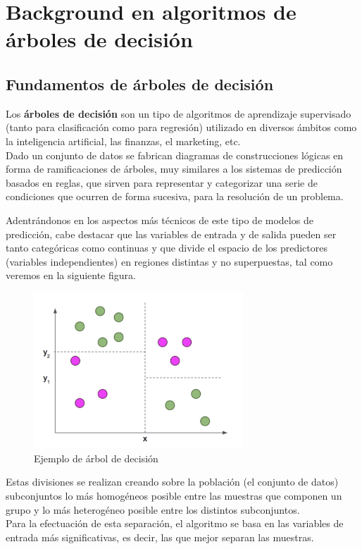 \chapter[Capítulo 3. Background en algoritmos de árboles de decisión]{Background en algoritmos de árboles de decisión}

\section{Fundamentos de árboles de decisión}

 Los \textbf{árboles de decisión} \cite{ref3} son un tipo de algoritmos de aprendizaje supervisado (tanto para clasificación como para regresión) utilizado en diversos ámbitos como la inteligencia artificial, las finanzas, el marketing, etc. \\ Dado un conjunto de datos se fabrican diagramas de construcciones lógicas en forma de ramificaciones de árboles, muy similares a los sistemas de predicción basados en reglas, que sirven para representar y categorizar una serie de condiciones que ocurren de forma sucesiva, para la resolución de un problema.
 
 Adentrándonos en los aspectos más técnicos de este tipo de modelos de predicción, cabe destacar que las variables de entrada y de salida pueden ser tanto categóricas como continuas y que divide el espacio de los predictores (variables independientes) en regiones distintas y no superpuestas, tal como veremos en la siguiente figura.
 
 \begin{figure}[H]
 	\centering
 	\includegraphics[width=0.7\textwidth]{imagenes/ejemploArboles} 
 	\caption{Ejemplo de árbol de decisión \cite{ref4}}
 \end{figure}
 
 Estas divisiones se realizan creando sobre la población (el conjunto de datos) subconjuntos lo más homogéneos posible entre las muestras que componen un grupo y lo más heterogéneo posible entre los distintos subconjuntos.\\
 Para la efectuación de esta separación, el algoritmo se basa en las variables de entrada más significativas, es decir, las que mejor separan las muestras.
 

